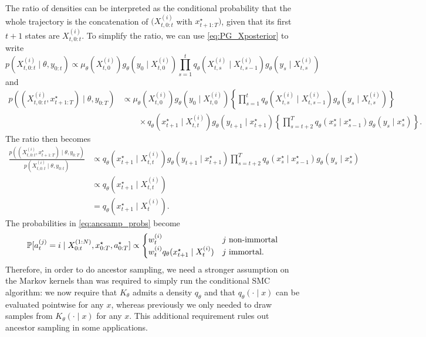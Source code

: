 The ratio of densities can be interpreted as the conditional probability that the whole trajectory is the concatenation of $(X_{t,0:t}^{(i)}$ with $x_{t+1:T}^\star)$, given that its first $t+1$ states are $X_{t,0:t}^{(i)}$.
To simplify the ratio, we can use \eqref{eq:PG_Xposterior} to write
\begin{equation*}
p( X_{t,0:t}^{(i)} \mid \theta, y_{0:t} )
\propto \mu_\theta( X_{t,0}^{(i)} ) g_\theta( y_0 \mid X_{t,0}^{(i)} ) 
        \prod_{s=1}^{t} q_\theta( X_{t,s}^{(i)} \mid X_{t,s-1}^{(i)} ) 
        g_\theta( y_s \mid X_{t,s}^{(i)} )
\end{equation*}
and %
\begin{align*}
p( (X_{t,0:t}^{(i)}, x_{t+1:T}^\star) \mid \theta, y_{0:T} )
&\propto \mu_\theta( X_{t,0}^{(i)} ) g_\theta( y_0 \mid X_{t,0}^{(i)} ) 
        \left\{ \prod_{s=1}^{t} q_\theta( X_{t,s}^{(i)} \mid X_{t,s-1}^{(i)} )
        g_\theta( y_s \mid X_{t,s}^{(i)} ) \right\} \\
    &\qquad\times q_\theta( x_{t+1}^\star \mid X_{t,t}^{(i)} ) 
        g_\theta( y_{t+1} \mid x_{t+1}^\star )
        \left\{ \prod_{s=t+2}^T q_\theta(x_s^\star \mid x_{s-1}^\star)
        g_\theta(y_s \mid x_s^\star) \right\} .
\end{align*}
The ratio then becomes
\begin{align*}
\frac{p( ( X_{t,0:t}^{(i)}, x_{t+1:T}^\star ) \mid \theta, y_{0:T} )}
        {p( X_{t,0:t}^{(i)} \mid \theta, y_{0:t} ) }
&\propto q_\theta( x_{t+1}^\star \mid X_{t,t}^{(i)} ) 
        g_\theta( y_{t+1} \mid x_{t+1}^\star ) 
        \prod_{s=t+2}^T q_\theta( x_s^\star \mid x_{s-1}^\star ) 
        g_\theta( y_s \mid x_s^\star ) \\
&\propto q_\theta( x_{t+1}^\star \mid X_{t,t}^{(i)} ) \\
&= q_\theta( x_{t+1}^\star \mid X_{t}^{(i)} )  .
\end{align*}
The probabilities in \eqref{eq:ancsamp_probs} become
\begin{equation}\label{eq:ancsamp_probs_simplified}
\mathbb{P}[a_t^{(j)} = i \mid X_{0:t}^{(1:N)}, x_{0:T}^\star, a_{0:T}^\star ] 
\propto \begin{cases}
w_t^{(i)} & j \text{ non-immortal}\\
w_t^{(i)} q_\theta( x_{t+1}^\star \mid X_{t}^{(i)} ) & j \text{ immortal} .
\end{cases}
\end{equation}
Therefore, in order to do ancestor sampling, we need a stronger assumption on the Markov kernels than was required to simply run the conditional SMC algorithm: we now require that $K_\theta$ admits a density $q_\theta$ and that $q_\theta(\cdot \mid x)$ can be evaluated pointwise for any $x$, whereas previously we only needed to draw samples from $K_\theta(\cdot\mid x)$ for any $x$.
This additional requirement rules out ancestor sampling in some applications.

